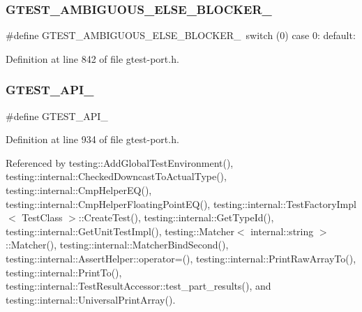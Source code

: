 \subsubsection{\texorpdfstring{G\+T\+E\+S\+T\+\_\+\+A\+M\+B\+I\+G\+U\+O\+U\+S\+\_\+\+E\+L\+S\+E\+\_\+\+B\+L\+O\+C\+K\+E\+R\+\_\+}{GTEST\_AMBIGUOUS\_ELSE\_BLOCKER\_}}
{\footnotesize\ttfamily \#define G\+T\+E\+S\+T\+\_\+\+A\+M\+B\+I\+G\+U\+O\+U\+S\+\_\+\+E\+L\+S\+E\+\_\+\+B\+L\+O\+C\+K\+E\+R\+\_\+~switch (0) case 0\+: default\+:}



Definition at line 842 of file gtest-\/port.\+h.

\mbox{\label{gtest-port_8h_aa73be6f0ba4a7456180a94904ce17790}} 
\subsubsection{\texorpdfstring{G\+T\+E\+S\+T\+\_\+\+A\+P\+I\+\_\+}{GTEST\_API\_}}
{\footnotesize\ttfamily \#define G\+T\+E\+S\+T\+\_\+\+A\+P\+I\+\_\+}



Definition at line 934 of file gtest-\/port.\+h.



Referenced by testing\+::\+Add\+Global\+Test\+Environment(), testing\+::internal\+::\+Checked\+Downcast\+To\+Actual\+Type(), testing\+::internal\+::\+Cmp\+Helper\+E\+Q(), testing\+::internal\+::\+Cmp\+Helper\+Floating\+Point\+E\+Q(), testing\+::internal\+::\+Test\+Factory\+Impl$<$ Test\+Class $>$\+::\+Create\+Test(), testing\+::internal\+::\+Get\+Type\+Id(), testing\+::internal\+::\+Get\+Unit\+Test\+Impl(), testing\+::\+Matcher$<$ internal\+::string $>$\+::\+Matcher(), testing\+::internal\+::\+Matcher\+Bind\+Second(), testing\+::internal\+::\+Assert\+Helper\+::operator=(), testing\+::internal\+::\+Print\+Raw\+Array\+To(), testing\+::internal\+::\+Print\+To(), testing\+::internal\+::\+Test\+Result\+Accessor\+::test\+\_\+part\+\_\+results(), and testing\+::internal\+::\+Universal\+Print\+Array().

\mbox{\label{gtest-port_8h_ab71a3e9a908b7b6acc0e8bddc0ecb3fe}} 
